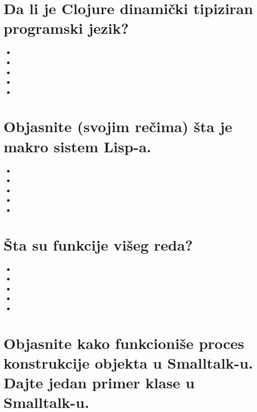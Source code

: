 \documentclass[11pt]{article}
\begin{document}
\section{Da li je Clojure dinamički tipiziran programski jezik?}
\label{sec:org4a1ad87}

\begin{itemize}
\item

\item

\item

\item

\item
\end{itemize}

\section{Objasnite (svojim rečima) šta je makro sistem Lisp-a.}
\label{sec:org37b4477}

\begin{itemize}
\item

\item

\item

\item

\item
\end{itemize}

\section{Šta su funkcije višeg reda?}
\label{sec:orge35bfd9}

\begin{itemize}
\item

\item

\item

\item

\item
\end{itemize}

\section{Objasnite kako funkcioniše proces konstrukcije objekta u Smalltalk-u. Dajte jedan primer klase u Smalltalk-u.}
\label{sec:org7644dba}
\end{document}
